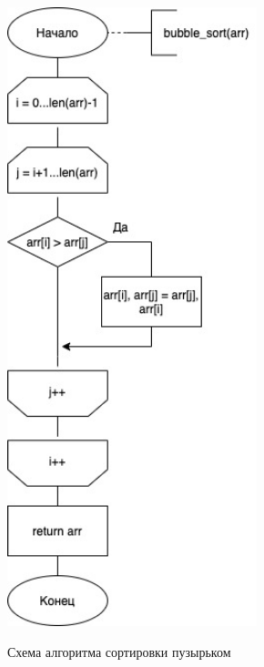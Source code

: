 \documentclass[12pt]{report}
\begin{document}
\begin{figure}
	\begin{center}
	{\includegraphics[height = 18cm]{bubble.jpg}}
	\caption{Схема алгоритма сортировки пузырьком}
	\label{ris:imageBubble}
	\end{center}
\end{figure}
	
\end{document}
